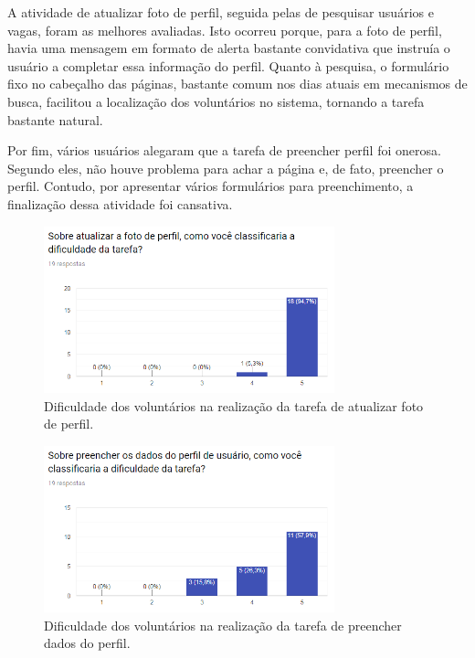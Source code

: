 A atividade de atualizar foto de perfil, seguida pelas de pesquisar usuários e vagas, foram as melhores avaliadas. Isto ocorreu porque, para a foto de perfil, havia uma mensagem em formato de alerta bastante convidativa que instruía o usuário a completar essa informação do perfil. Quanto à pesquisa, o formulário fixo no cabeçalho das páginas, bastante comum nos dias atuais em mecanismos de busca, facilitou a localização dos voluntários no sistema, tornando a tarefa bastante natural.

Por fim, vários usuários alegaram que a tarefa de preencher perfil foi onerosa. Segundo eles, não houve problema para achar a página e, de fato, preencher o perfil. Contudo, por apresentar vários formulários para preenchimento, a finalização dessa atividade foi cansativa.


\begin{figure}[h]
    \caption{Dificuldade dos voluntários na realização da tarefa de atualizar foto de perfil.}
       	\begin{center}
            \includegraphics[width=0.75\textwidth]{figuras/avaliacao/pdv-1.png}
        \end{center}
    \label{avalGrafTUPerfil}
\end{figure} 

\begin{figure}[h]
    \caption{Dificuldade dos voluntários na realização da tarefa de preencher dados do perfil.}
       	\begin{center}
            \includegraphics[width=0.75\textwidth]{figuras/avaliacao/pdv-2.png}
        \end{center}
    \label{avalGrafTUPreencherPerfil}
\end{figure} 

